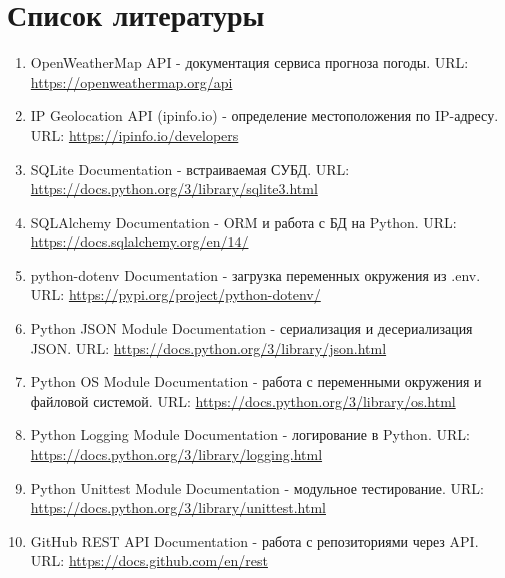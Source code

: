 \documentclass[oneside,a4paper,14pt]{extarticle}
\begin{document}
\section*{Список литературы}
\begin{enumerate}
	\item OpenWeatherMap API - документация сервиса прогноза погоды. URL: \href{https://openweathermap.org/api}{https://openweathermap.org/api}
	\item IP Geolocation API (ipinfo.io) - определение местоположения по IP-адресу. URL: \href{https://ipinfo.io/developers}{https://ipinfo.io/developers}
	\item SQLite Documentation - встраиваемая СУБД. URL: \href{https://docs.python.org/3/library/sqlite3.html}{https://docs.python.org/3/library/sqlite3.html}
	\item SQLAlchemy Documentation - ORM и работа с БД на Python. URL: \href{https://docs.sqlalchemy.org/en/14/}{https://docs.sqlalchemy.org/en/14/}
	\item python-dotenv Documentation - загрузка переменных окружения из .env. URL: \href{https://pypi.org/project/python-dotenv/}{https://pypi.org/project/python-dotenv/}
	\item Python JSON Module Documentation - сериализация и десериализация JSON. URL: \href{https://docs.python.org/3/library/json.html}{https://docs.python.org/3/library/json.html}
	\item Python OS Module Documentation - работа с переменными окружения и файловой системой. URL: \href{https://docs.python.org/3/library/os.html}{https://docs.python.org/3/library/os.html}
	\item Python Logging Module Documentation - логирование в Python. URL: \href{https://docs.python.org/3/library/logging.html}{https://docs.python.org/3/library/logging.html}
	\item Python Unittest Module Documentation - модульное тестирование. URL: \href{https://docs.python.org/3/library/unittest.html}{https://docs.python.org/3/library/unittest.html}
	\item GitHub REST API Documentation - работа с репозиториями через API. URL: \href{https://docs.github.com/en/rest}{https://docs.github.com/en/rest}
\end{enumerate}
\end{document}
